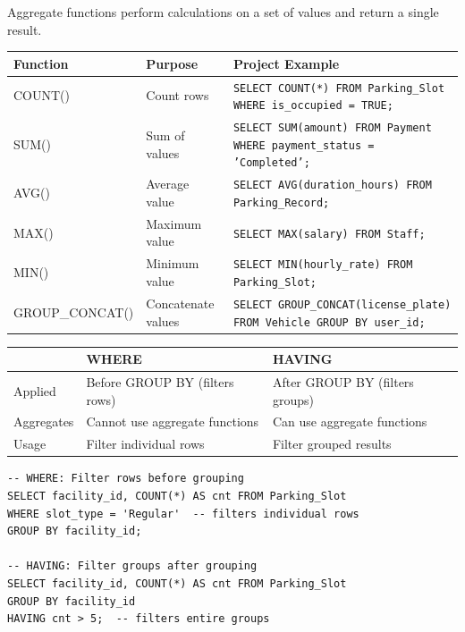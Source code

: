 \documentclass[12pt,a4paper]{article}
\begin{document}
\begin{questionbox}
\end{questionbox}
\begin{answerbox}
Aggregate functions perform calculations on a set of values and return a single result.

\begin{longtable}{@{}llp{6cm}@{}}
\toprule
\textbf{Function} & \textbf{Purpose} & \textbf{Project Example} \\
\midrule
COUNT() & Count rows & \texttt{SELECT COUNT(*) FROM Parking\_Slot WHERE is\_occupied = TRUE;} \\
SUM()   & Sum of values & \texttt{SELECT SUM(amount) FROM Payment WHERE payment\_status = 'Completed';} \\
AVG()   & Average value & \texttt{SELECT AVG(duration\_hours) FROM Parking\_Record;} \\
MAX()   & Maximum value & \texttt{SELECT MAX(salary) FROM Staff;} \\
MIN()   & Minimum value & \texttt{SELECT MIN(hourly\_rate) FROM Parking\_Slot;} \\
GROUP\_CONCAT() & Concatenate values & \texttt{SELECT GROUP\_CONCAT(license\_plate) FROM Vehicle GROUP BY user\_id;} \\
\bottomrule
\end{longtable}
\end{answerbox}

\begin{questionbox}
\end{questionbox}
\begin{answerbox}
\begin{longtable}{@{}lp{5.5cm}p{5.5cm}@{}}
\toprule
& \textbf{WHERE} & \textbf{HAVING} \\
\midrule
Applied & Before GROUP BY (filters rows) & After GROUP BY (filters groups) \\
Aggregates & Cannot use aggregate functions & Can use aggregate functions \\
Usage & Filter individual rows & Filter grouped results \\
\bottomrule
\end{longtable}

\begin{lstlisting}
-- WHERE: Filter rows before grouping
SELECT facility_id, COUNT(*) AS cnt FROM Parking_Slot
WHERE slot_type = 'Regular'  -- filters individual rows
GROUP BY facility_id;

-- HAVING: Filter groups after grouping
SELECT facility_id, COUNT(*) AS cnt FROM Parking_Slot
GROUP BY facility_id
HAVING cnt > 5;  -- filters entire groups
\end{lstlisting}
\end{answerbox}
\end{document}
